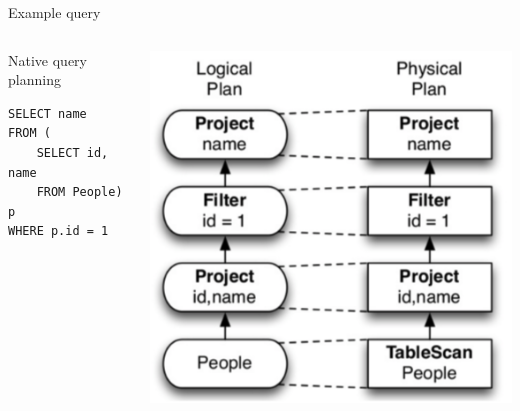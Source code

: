 \begin{frame}[fragile=singleslide]{Example query}
\begin{columns}

\begin{column}{0.5\textwidth}
Native query planning
\begin{verbatim}
SELECT name
FROM (
	SELECT id, name
	FROM People) p
WHERE p.id = 1
\end{verbatim}
\end{column}

\begin{column}{0.5\textwidth}
   	\begin{center}
     		\includegraphics[scale=0.4]{figures/ex-p2}
   	\end{center}
\end{column}
\end{columns}
\end{frame}

